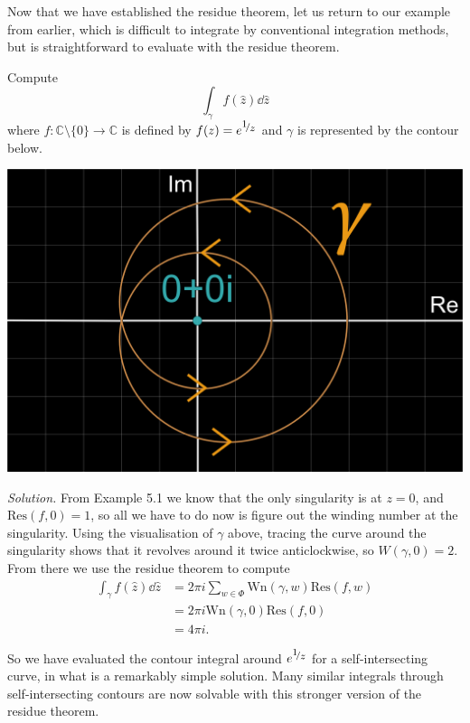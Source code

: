 \documentclass[a4paper]{article}
\def\nicefrac#1#2{%
    \raise.5ex\hbox{\begin{footnotesize}$#1$\end{footnotesize}}%
    \kern-.15em/\kern-.035em%
    \lower.25ex\hbox{\begin{footnotesize}$#2$\end{footnotesize}}}
\def\Res{\text{Res}}
\def\Wind{\text{Wn}}
\begin{document}
Now that we have established the residue theorem, let us return to our example from earlier, which is difficult to integrate by conventional integration methods, but is straightforward to evaluate with the residue theorem. 


\begin{example}{}{}\label{thm:finalexample}
Compute
\[ \int_\gamma { f(\hat{z}) \dd\hat{z}}\]
where $f: \mathbb{C}\setminus\{0\} \rightarrow \mathbb{C}$ is defined by $f(z)=e^{\nicefrac{1}{z}}$ and $\gamma$ is represented by the contour below.

\begin{center}
\includegraphics[scale=0.11]{limaconint4}
\end{center}
\end{example} 

\noindent\textit{Solution.}
From Example 5.1 we know that the only singularity is at $z=0$, and $\Res (f,0)= 1$, so all we have to do now is figure out the winding number at the singularity. Using the visualisation of $\gamma$ above, tracing the curve around the singularity shows that it revolves around it twice anticlockwise, so $W(\gamma,0)=2$. From there we use the residue theorem to compute 
\begin{align} 
\int_\gamma { f(\hat{z}) \dd\hat{z}} &= 2 \pi i \sum_{w \in \Phi} \Wind (\gamma,w) \Res (f,w) \nonumber \\
&= 2\pi i \Wind (\gamma,0) \Res (f,0) \nonumber \\
&= 4\pi i. \nonumber
\end{align}

So we have evaluated the contour integral around $e^{\nicefrac{1}{z}}$ for a self-intersecting curve, in what is a remarkably simple solution. Many similar integrals through self-intersecting contours are now solvable with this stronger version of the residue theorem.
\end{document}
